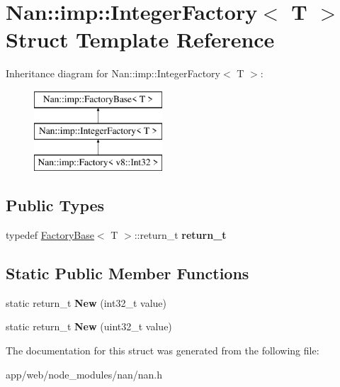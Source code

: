 \hypertarget{struct_nan_1_1imp_1_1_integer_factory}{}\section{Nan\+:\+:imp\+:\+:Integer\+Factory$<$ T $>$ Struct Template Reference}
\label{struct_nan_1_1imp_1_1_integer_factory}
Inheritance diagram for Nan\+:\+:imp\+:\+:Integer\+Factory$<$ T $>$\+:\begin{figure}[H]
\begin{center}
\leavevmode
\includegraphics[height=3.000000cm]{struct_nan_1_1imp_1_1_integer_factory}
\end{center}
\end{figure}
\subsection*{Public Types}
\begin{DoxyCompactItemize}
\item 
\mbox{\label{struct_nan_1_1imp_1_1_integer_factory_aee8f98d43afb2587becc1428fcc9f614}} 
typedef \hyperlink{struct_nan_1_1imp_1_1_factory_base}{Factory\+Base}$<$ T $>$\+::return\+\_\+t {\bfseries return\+\_\+t}
\end{DoxyCompactItemize}
\subsection*{Static Public Member Functions}
\begin{DoxyCompactItemize}
\item 
\mbox{\label{struct_nan_1_1imp_1_1_integer_factory_ab9f04cde81af4e48cc601ee63350d9b9}} 
static return\+\_\+t {\bfseries New} (int32\+\_\+t value)
\item 
\mbox{\label{struct_nan_1_1imp_1_1_integer_factory_a165463a1c83ecafb17656f17dea693cb}} 
static return\+\_\+t {\bfseries New} (uint32\+\_\+t value)
\end{DoxyCompactItemize}


The documentation for this struct was generated from the following file\+:\begin{DoxyCompactItemize}
\item 
app/web/node\+\_\+modules/nan/nan.\+h\end{DoxyCompactItemize}
